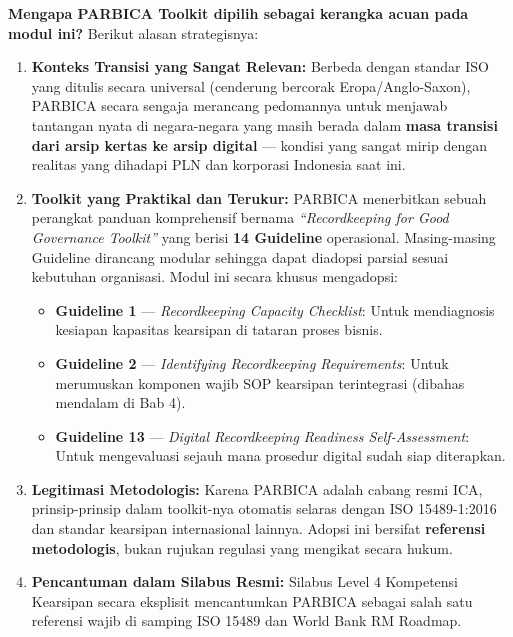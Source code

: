 \documentclass[12pt,a4paper]{report}
\begin{document}
\textbf{Mengapa PARBICA Toolkit dipilih sebagai kerangka acuan pada modul ini?} Berikut alasan strategisnya:

\begin{enumerate}[leftmargin=*]
    \item \textbf{Konteks Transisi yang Sangat Relevan:} Berbeda dengan standar ISO yang ditulis secara universal (cenderung bercorak Eropa/Anglo-Saxon), PARBICA secara sengaja merancang pedomannya untuk menjawab tantangan nyata di negara-negara yang masih berada dalam \textbf{masa transisi dari arsip kertas ke arsip digital} --- kondisi yang sangat mirip dengan realitas yang dihadapi PLN dan korporasi Indonesia saat ini.
    \item \textbf{Toolkit yang Praktikal dan Terukur:} PARBICA menerbitkan sebuah perangkat panduan komprehensif bernama \textit{``Recordkeeping for Good Governance Toolkit''} yang berisi \textbf{14 Guideline} operasional. Masing-masing Guideline dirancang modular sehingga dapat diadopsi parsial sesuai kebutuhan organisasi. Modul ini secara khusus mengadopsi:
    \begin{itemize}[nosep]
        \item \textbf{Guideline 1} --- \textit{Recordkeeping Capacity Checklist}: Untuk mendiagnosis kesiapan kapasitas kearsipan di tataran proses bisnis.
        \item \textbf{Guideline 2} --- \textit{Identifying Recordkeeping Requirements}: Untuk merumuskan komponen wajib SOP kearsipan terintegrasi (dibahas mendalam di Bab 4).
        \item \textbf{Guideline 13} --- \textit{Digital Recordkeeping Readiness Self-Assessment}: Untuk mengevaluasi sejauh mana prosedur digital sudah siap diterapkan.
    \end{itemize}
    \item \textbf{Legitimasi Metodologis:} Karena PARBICA adalah cabang resmi ICA, prinsip-prinsip dalam toolkit-nya otomatis selaras dengan ISO 15489-1:2016 dan standar kearsipan internasional lainnya. Adopsi ini bersifat \textbf{referensi metodologis}, bukan rujukan regulasi yang mengikat secara hukum.
    \item \textbf{Pencantuman dalam Silabus Resmi:} Silabus Level 4 Kompetensi Kearsipan secara eksplisit mencantumkan PARBICA sebagai salah satu referensi wajib di samping ISO 15489 dan World Bank RM Roadmap.
\end{enumerate}
\end{document}

